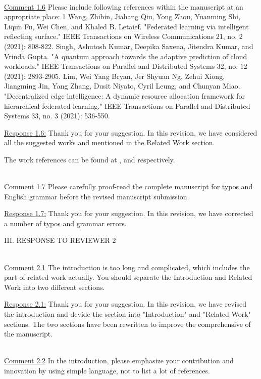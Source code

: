 ~\\
\color{blue}
\underline{Comment 1.6}
Please include following references within the manuscript at an appropriate
place:
1 Wang, Zhibin, Jiahang Qiu, Yong Zhou, Yuanming Shi, Liqun Fu, Wei
Chen, and Khaled B. Letaief. "Federated learning via intelligent
reflecting surface." IEEE Transactions on Wireless Communications 21, no.
2 (2021): 808-822.
Singh, Ashutosh Kumar, Deepika Saxena, Jitendra Kumar, and Vrinda
Gupta. "A quantum approach towards the adaptive prediction of cloud
workloads." IEEE Transactions on Parallel and Distributed Systems 32, no.
12 (2021): 2893-2905.
Lim, Wei Yang Bryan, Jer Shyuan Ng, Zehui Xiong, Jiangming Jin, Yang
Zhang, Dusit Niyato, Cyril Leung, and Chunyan Miao. "Decentralized
edge intelligence: A dynamic resource allocation framework for
hierarchical federated learning." IEEE Transactions on Parallel and
Distributed Systems 33, no. 3 (2021): 536-550.

\color{black}
\underline{Response 1.6:}
Thank you for your suggestion. In this revision, we have considered all the suggested works and mentioned in the Related Work section. 

\colorbox{marygold}{The work references can be found at \cite{FLviaIntel}, \cite{distributedQuantum} and \cite{hierarchicalFL} respectively.}


~\\
\color{blue}
\underline{Comment 1.7}
 Please carefully proof-read the complete manuscript for typos and English
grammar before the revised manuscript submission.

\color{black}
\underline{Response 1.7:}
Thank you for your suggestion. In this revision, we have corrected a number of typos and grammar errors.


\newpage

III. RESPONSE TO REVIEWER 2

~\\
\color{blue}
\underline{Comment 2.1}
The introduction is too long and complicated, which includes the part of related work actually. You should separate the
Introduction and Related Work into two different sections.

\color{black}
\underline{Response 2.1:}
Thank you for your suggestion. In this revision, we have revised the introduction and devide the section into "Introduction" and "Related Work" sections. The two sections have been rewritten to improve the comprehensive of the manuscript. 



~\\
\color{blue}
\underline{Comment 2.2} In the introduction, please emphasize your contribution and innovation by using simple language, not to list a lot of
references.


